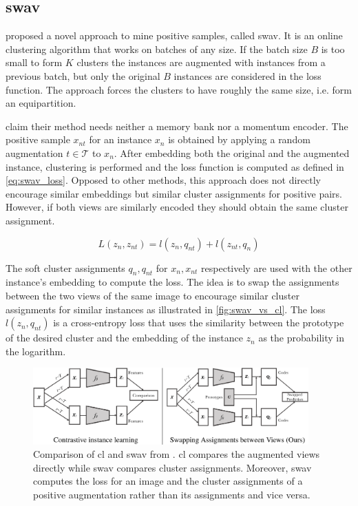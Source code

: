 \subsection{\acl{swav}}\label{subsec:SwAV}

\citet{swav_2020} proposed a novel approach to mine positive samples, called \ac{swav}.
It is an online clustering algorithm that works on batches of any size.
If the batch size $B$ is too small to form $K$ clusters the instances are augmented 
with instances from a previous batch, 
but only the original $B$ instances are considered in the loss function.
The approach forces the clusters to have roughly the same size, i.e. form an equipartition.

\citeauthor{swav_2020} claim their method needs neither a memory bank nor a momentum encoder.
The positive sample $x_{nt}$ for an instance $x_n$ is obtained by applying a 
random augmentation $t \in \mathcal{T}$ to $x_n$.
After embedding both the original and the augmented instance, clustering is performed and 
the loss function is computed as defined in \eqref{eq:swav_loss}.
Opposed to other methods, this approach does not directly encourage similar embeddings but similar 
cluster assignments for positive pairs.
However, if both views are similarly encoded they should obtain the same cluster assignment.

\begin{equation}
    L(z_n, z_{nt}) = l(z_n, q_{nt}) + l(z_{nt}, q_n)
    \label{eq:swav_loss}
\end{equation}

The soft cluster assignments $q_n, q_{nt}$ for $x_n, x_{nt}$ respectively 
are used with the other instance's embedding to compute the loss.
The idea is to swap the assignments between the two views of the same image to encourage 
similar cluster assignments for similar instances as illustrated in \autoref{fig:swav_vs_cl}.
The loss $l(z_n, q_{nt})$ is a cross-entropy loss that uses the similarity between the prototype 
of the desired cluster and the embedding of the instance $z_n$ as the probability in the logarithm.

\begin{figure}[h] %
    \centering
    \includegraphics[width=300pt]{images/SwAV_vs_CL.png}
    \caption{Comparison of \ac{cl} and \ac{swav} from \citet{swav_2020}.
    \ac{cl} compares the augmented views directly while 
    \ac{swav} compares cluster assignments.
    Moreover, \ac{swav} computes the loss for an image and the cluster assignments of a positive augmentation 
    rather than its assignments and vice versa.}
    \label{fig:swav_vs_cl}
\end{figure}

